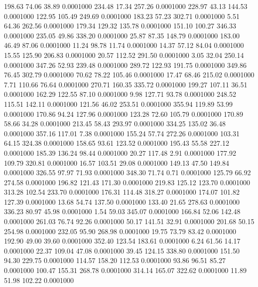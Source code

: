  198.63   74.06   38.89   0.0001000
 234.48   17.34  257.26   0.0001000
 228.97   43.13  144.53   0.0001000
 122.95  105.49  249.69   0.0001000
 183.23   57.23  302.71   0.0001000
   5.51   64.36  262.56   0.0001000
 179.34  129.32  135.78   0.0001000
 151.10  100.27  346.33   0.0001000
 235.05   49.86  338.20   0.0001000
  25.87   87.35  148.79   0.0001000
 183.00   46.49   87.06   0.0001000
  11.24   98.78   11.74   0.0001000
  14.37   57.12   84.04   0.0001000
  15.55  125.90  206.83   0.0001000
  20.57  112.52  291.50   0.0001000
   3.05   32.04  250.14   0.0001000
 347.26   52.93  239.48   0.0001000
 289.72  122.93  191.75   0.0001000
 349.86   76.45  302.79   0.0001000
  70.62   78.22  105.46   0.0001000
  17.47   68.46  215.02   0.0001000
   7.71  110.66   76.64   0.0001000
 270.71  160.35  335.72   0.0001000
 199.27  107.11   36.51   0.0001000
 162.29  122.55   87.10   0.0001000
   9.98  127.71   93.78   0.0001000
 248.52  115.51  142.11   0.0001000
 121.56   46.02  253.51   0.0001000
 355.94  119.89   53.99   0.0001000
 170.86   94.24  127.96   0.0001000
 123.28   72.60  105.79   0.0001000
 170.89   58.66   34.28   0.0001000
 213.45   58.43  293.97   0.0001000
 334.25  135.02   36.48   0.0001000
 357.16  117.01    7.38   0.0001000
 155.24   57.74  272.26   0.0001000
 103.31   64.15  324.38   0.0001000
 158.65   93.61  123.52   0.0001000
 195.43   55.58  227.12   0.0001000
 185.39  136.24   98.44   0.0001000
  20.27  117.48    2.91   0.0001000
 177.92  109.79  320.81   0.0001000
  16.57  103.51   29.08   0.0001000
 149.13   47.50  149.84   0.0001000
 326.55   97.97   71.93   0.0001000
 348.30   71.74    0.71   0.0001000
 125.79   66.92  274.58   0.0001000
 196.82  121.43  171.30   0.0001000
 219.83  125.12  123.70   0.0001000
 313.28  102.54  233.70   0.0001000
 176.31  114.48  318.27   0.0001000
 174.07  101.82  127.39   0.0001000
  13.68   54.74  137.50   0.0001000
 133.40   21.65  278.63   0.0001000
 336.23   80.97   45.98   0.0001000
   1.54   59.03  345.07   0.0001000
 166.84   52.06  142.48   0.0001000
 261.03   76.74   92.26   0.0001000
  50.17  141.51   32.91   0.0001000
 201.68   50.15  254.98   0.0001000
 232.05   95.90  268.98   0.0001000
  19.75   73.79   83.42   0.0001000
 192.90   49.00   39.60   0.0001000
 352.40  123.54  183.61   0.0001000
   6.24   61.56   14.17   0.0001000
  22.37  109.04   47.08   0.0001000
  39.45  124.15  338.80   0.0001000
 151.50   94.30  229.75   0.0001000
 114.57  158.20  112.53   0.0001000
  93.86   96.51   85.27   0.0001000
 100.47  155.31  268.78   0.0001000
 314.14  165.07  322.62   0.0001000
  11.89   51.98  102.22   0.0001000
